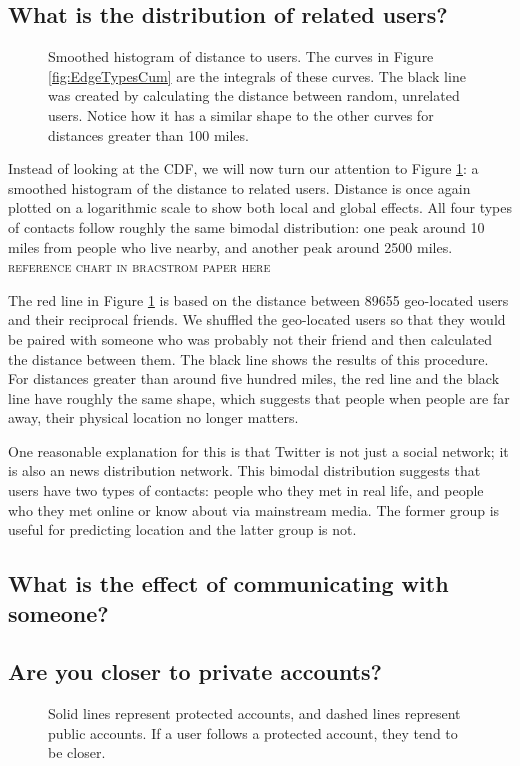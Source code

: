 \documentclass{sig-alternate}
\begin{document}
\subsection{What is the distribution of related users?}
\begin{figure}
\centering
{}
\caption{
Smoothed histogram of distance to users.  The curves in Figure
\ref{fig:EdgeTypesCum} are the integrals of these curves. The black line was created by calculating the distance between random, unrelated users. Notice how it has a similar shape to the other curves for distances greater than 100 miles.
}
\label{fig:EdgeTypes}
\end{figure}
Instead of looking at the CDF, we will now turn our attention to Figure
\ref{fig:EdgeTypes}: a smoothed histogram of the distance to related users.
Distance is once again plotted on a logarithmic scale to show both local and
global effects.
All four types of contacts follow roughly the same bimodal distribution:
one peak around 10 miles from people who live nearby, and another peak around
2500 miles.
\textsc{reference chart in bracstrom paper here}

The red line in Figure \ref{fig:EdgeTypes} is based on the distance between
89655 geo-located users and their reciprocal friends. We shuffled the
geo-located users so that they would be paired with someone who was probably
not their friend and then calculated the distance between them. The black line
shows the results of this procedure. For distances greater than around five
hundred miles, the red line and the black line have roughly the same shape,
which suggests that people when people are far away, their physical location no longer matters.

One reasonable explanation for this is that Twitter is not just a social
network; it is also an news distribution network.  This bimodal distribution
suggests that users have two types of contacts: people who they met in
real life, and people who they met online or know about via mainstream media.
The former group is useful for predicting location and the latter group is not.

\subsection{What is the effect of communicating with someone?}

\subsection{Are you closer to private accounts?}
\begin{figure}
\centering
{}
\caption{ Solid lines represent protected accounts, and dashed lines represent
public accounts. If a user follows a protected account, they tend to be closer.}
\label{fig:EdgeTypesProt}
\end{figure}
\end{document}

